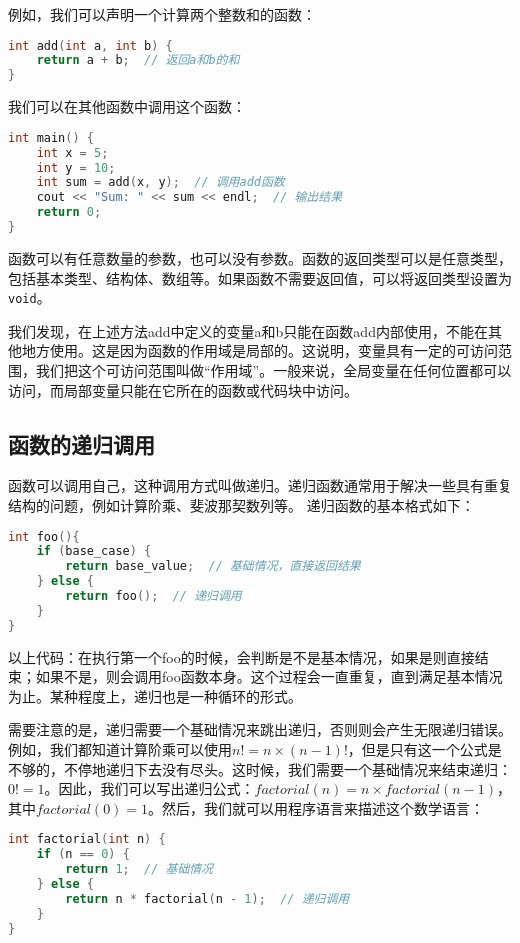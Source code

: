 例如，我们可以声明一个计算两个整数和的函数：
\begin{lstlisting}[language=C++]
int add(int a, int b) {
    return a + b;  // 返回a和b的和
}
\end{lstlisting}
我们可以在其他函数中调用这个函数：
\begin{lstlisting}[language=C++]
int main() {
    int x = 5;
    int y = 10;
    int sum = add(x, y);  // 调用add函数
    cout << "Sum: " << sum << endl;  // 输出结果
    return 0;
}
\end{lstlisting}

函数可以有任意数量的参数，也可以没有参数。函数的返回类型可以是任意类型，包括基本类型、结构体、数组等。如果函数不需要返回值，可以将返回类型设置为\texttt{void}。

我们发现，在上述方法add中定义的变量a和b只能在函数add内部使用，不能在其他地方使用。这是因为函数的作用域是局部的。这说明，变量具有一定的可访问范围，我们把这个可访问范围叫做“作用域”。一般来说，全局变量在任何位置都可以访问，而局部变量只能在它所在的函数或代码块中访问。

\subsection{函数的递归调用}

函数可以调用自己，这种调用方式叫做递归。递归函数通常用于解决一些具有重复结构的问题，例如计算阶乘、斐波那契数列等。
递归函数的基本格式如下：
\begin{lstlisting}[language=C++]
int foo(){
    if (base_case) {
        return base_value;  // 基础情况，直接返回结果
    } else {
        return foo();  // 递归调用
    }
}
\end{lstlisting}

以上代码：在执行第一个foo的时候，会判断是不是基本情况，如果是则直接结束；如果不是，则会调用foo函数本身。这个过程会一直重复，直到满足基本情况为止。某种程度上，递归也是一种循环的形式。

需要注意的是，递归需要一个基础情况来跳出递归，否则则会产生无限递归错误。例如，我们都知道计算阶乘可以使用$n!=n\times(n-1)!$，但是只有这一个公式是不够的，不停地递归下去没有尽头。这时候，我们需要一个基础情况来结束递归：$0!=1$。因此，我们可以写出递归公式：$factorial(n) = n \times factorial(n-1)$，其中$factorial(0) = 1$。然后，我们就可以用程序语言来描述这个数学语言：
\begin{lstlisting}[language=C++]
int factorial(int n) {
    if (n == 0) {
        return 1;  // 基础情况
    } else {
        return n * factorial(n - 1);  // 递归调用
    }
}
\end{lstlisting}

